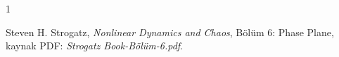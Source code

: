 \begin{thebibliography}{1}

Steven H. Strogatz, \textit{Nonlinear Dynamics and Chaos}, Bölüm 6: Phase Plane, kaynak PDF: \textit{Strogatz Book-Bölüm-6.pdf}.

\end{thebibliography} 
